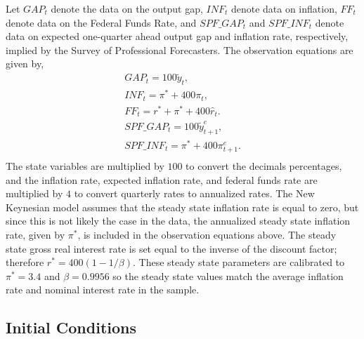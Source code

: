\documentclass[12pt]{article}
\newcommand{\bdm}{\begin{displaymath}}
\newcommand{\edm}{\end{displaymath}}
\newcommand{\h}[1]{\hat{#1}}
\newcommand{\ds}{\displaystyle}
\begin{document}
Let $GAP_t$ denote the data on the output gap, $INF_t$ denote data on inflation, $FF_t$ denote data on the Federal Funds Rate, and $SPF\_GAP_t$ and $SPF\_INF_t$ denote data on expected one-quarter ahead output gap and inflation rate, respectively, implied by the Survey of Professional Forecasters.  The observation equations are given by,
\bdm \begin{array}{l} \label{eq:obs}  
\ds GAP_t = 100 \tilde{y}_t, \\
\ds INF_t = \pi^{*} + 400\pi_t, \\
\ds FF_t = r^{*} + \pi^* + 400\h{r}_t.\\
\ds SPF\_GAP_t = 100 \tilde{y}_{t+1}^e, \\
\ds SPF\_INF_t = \pi^{*} + 400\pi_{t+1}^e. \\
\end{array}
\edm
The state variables are multiplied by $100$ to convert the decimals percentages, and the inflation rate, expected inflation rate, and federal funds rate are multiplied by $4$ to convert quarterly rates to annualized rates.  The New Keynesian model assumes that the steady state inflation rate is equal to zero, but since this is not likely the case in the data, the annualized steady state inflation rate, given by  $\pi^*$, is included in the observation equations above.  The steady state gross real interest rate is set equal to the inverse of the discount factor; therefore $r^* = 400(1-1/\beta)$.  These steady state parameters are calibrated to $\pi^*=3.4$ and $\beta=0.9956$ so the steady state values match the average inflation rate and nominal interest rate in the sample.

\subsection{Initial Conditions}
\end{document}
